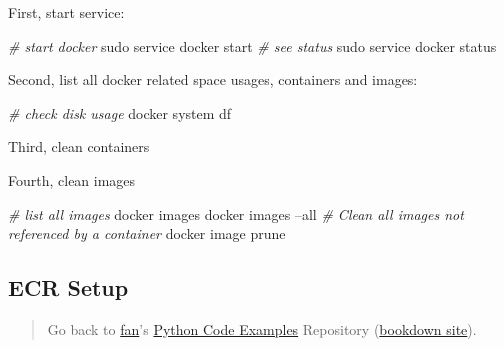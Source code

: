 \documentclass[
]{book}
\newenvironment{Shaded}{\begin{snugshade}}{\end{snugshade}}
\newcommand{\CommentTok}[1]{\textcolor[rgb]{0.56,0.35,0.01}{\textit{#1}}}
\newcommand{\ExtensionTok}[1]{#1}
\newcommand{\FunctionTok}[1]{\textcolor[rgb]{0.00,0.00,0.00}{#1}}
\newcommand{\NormalTok}[1]{#1}
\newcommand{\VariableTok}[1]{\textcolor[rgb]{0.00,0.00,0.00}{#1}}
\begin{document}
First, start service:

\begin{Shaded}
\begin{Highlighting}[]
\CommentTok{# start docker}
\FunctionTok{sudo}\NormalTok{ service docker start}
\CommentTok{# see status}
\FunctionTok{sudo}\NormalTok{ service docker status}
\end{Highlighting}
\end{Shaded}

Second, list all docker related space usages, containers and images:

\begin{Shaded}
\begin{Highlighting}[]
\CommentTok{# check disk usage}
\ExtensionTok{docker}\NormalTok{ system df}
\end{Highlighting}
\end{Shaded}

Third, clean containers

\begin{Shaded}
\end{Shaded}

Fourth, clean images

\begin{Shaded}
\begin{Highlighting}[]
\CommentTok{# list all images}
\ExtensionTok{docker}\NormalTok{ images}
\ExtensionTok{docker}\NormalTok{ images --all}
\CommentTok{# Clean all images not referenced by a container}
\ExtensionTok{docker}\NormalTok{ image prune}
\end{Highlighting}
\end{Shaded}

\hypertarget{ecr-setup}{%
\subsection{ECR Setup}\label{ecr-setup}}

\begin{quote}
Go back to \href{http://fanwangecon.github.io/}{fan}'s \href{https://fanwangecon.github.io/pyfan/}{Python Code Examples} Repository (\href{https://fanwangecon.github.io/pyfan/bookdown}{bookdown site}).
\end{quote}
\end{document}
